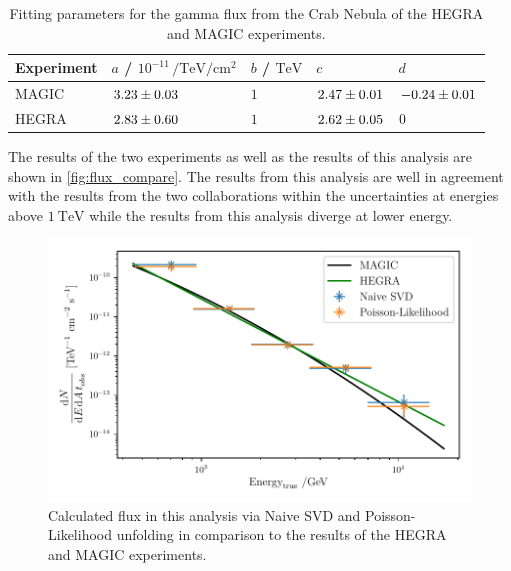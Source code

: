 \begin{table}[tb]
  \centering
  \caption{Fitting parameters for the gamma flux from the Crab Nebula of the HEGRA and MAGIC experiments.}
  \begin{tabular}{l l l l l}
    \toprule
    Experiment & $a$ / $10^{-11}\,\si{\per\tera\eV\per\cm\squared}$ & $b$ / $\si{\tera\eV}$  & $c$ & $d$ \\
    \midrule
    MAGIC & $\num{3.23 \pm .03}$ & $\num{1}$ & $\num{2.47 \pm .01}$ & $\num{-0.24 \pm .01}$ \\
    HEGRA & $\num{2.83 \pm .6}$ & $\num{1}$ & $\num{2.62 \pm .05}$ & $\num{0 \pm 0}$ \\
    \bottomrule
  \end{tabular}
  \label{tab:meas}
\end{table}
The results of the two experiments as well as the results of this analysis are shown in \autoref{fig:flux_compare}. The results from this analysis are well in agreement with the results from the two collaborations within the uncertainties at energies above $\SI{1}{\tera\eV}$ while the results from this analysis diverge at lower energy.

\begin{figure}[tb]
  \centering
  \includegraphics[width=.7\textwidth]{plots/flux_compare.pdf}
  \caption{Calculated flux in this analysis via Naive SVD and Poisson-Likelihood unfolding in comparison to the results of the HEGRA and MAGIC experiments.}
  \label{fig:flux_compare}
\end{figure}

